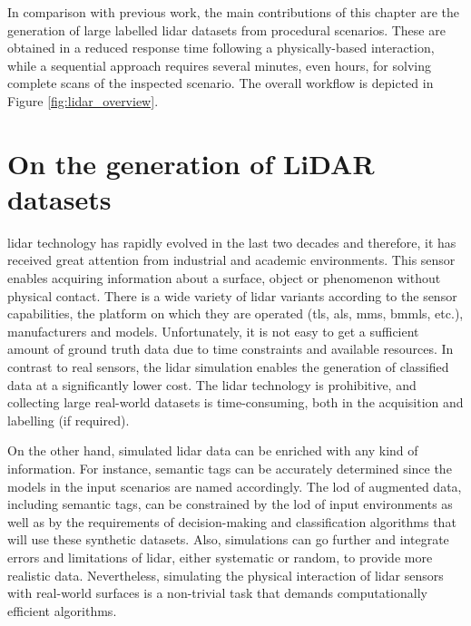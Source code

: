 In comparison with previous work, the main contributions of this chapter are the generation of large labelled \acrshort{lidar} datasets from procedural scenarios. These are obtained in a reduced response time following a physically-based interaction, while a sequential approach requires several minutes, even hours, for solving complete scans of the inspected scenario. The overall workflow is depicted in Figure \ref{fig:lidar_overview}. 

\section{On the generation of LiDAR datasets}

\acrshort{lidar} technology has rapidly evolved in the last two decades and therefore, it has received great attention from industrial and academic environments. This sensor enables acquiring information about a surface, object or phenomenon without physical contact. There is a wide variety of \acrshort{lidar} variants according to the sensor capabilities, the platform on which they are operated (\acrshort{tls}, \acrshort{als}, \acrshort{mms}, \acrshort{bmmls}, etc.), manufacturers and models. Unfortunately, it is not easy to get a sufficient amount of ground truth data due to time constraints and available resources. In contrast to real sensors, the \acrshort{lidar} simulation enables the generation of classified data at a significantly lower cost. The \acrshort{lidar} technology is prohibitive, and collecting large real-world datasets is time-consuming, both in the acquisition and labelling (if required). 

On the other hand, simulated \acrshort{lidar} data can be enriched with any kind of information. For instance, semantic tags can be accurately determined since the models in the input scenarios are named accordingly. The \acrshort{lod} of augmented data, including semantic tags, can be constrained by the \acrshort{lod} of input environments as well as by the requirements of decision-making and classification algorithms that will use these synthetic datasets. Also, simulations can go further and integrate errors and limitations of \acrshort{lidar}, either systematic or random, to provide more realistic data. Nevertheless, simulating the physical interaction of \acrshort{lidar} sensors with real-world surfaces is a non-trivial task that demands computationally efficient algorithms. 

